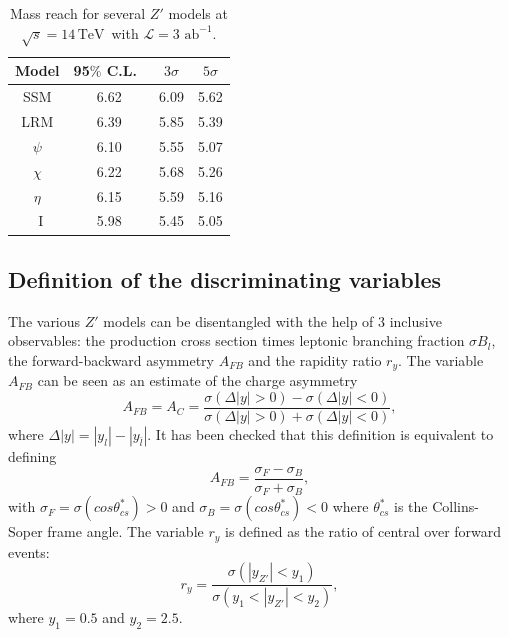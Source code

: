 \documentclass[a4paper,11pt]{article}
\newcommand*{\cl}{C.L.~}
\newcommand*{\sqrtslhc}{\ensuremath{\sqrt{s}=14\,\text{TeV}}}
\newcommand*{\intlumihllhc}{\ensuremath{\mathcal{L}=3\text{ ab}^{-1}}}
\begin{document}
%
\begin{table}
\centering
\begin{tabular}{c|c|c|c}

  Model &   95$\%$ \cl  &  $3\sigma$  & $5\sigma$   \\
\hline
\hline
SSM    &     6.62     &  6.09    &  5.62     \\
LRM    &   6.39     & 5.85     & 5.39  \\
$\psi$    &  6.10   & 5.55   & 5.07  \\
$\chi$   &  6.22    & 5.68    & 5.26   \\
$\eta$   &  6.15     &  5.59  &  5.16   \\
~I        & 5.98   &  5.45   &  5.05  \\
\end{tabular}
\caption{ Mass reach for several $Z'$ models at \sqrtslhc\ with \intlumihllhc. }
\label{tab:pheno:spec}
\end{table}
%

\subsection{Definition of the discriminating variables}
\label{par:vardef}

The various $Z'$ models can be disentangled with the help of 3 inclusive observables: the production cross section times leptonic branching fraction $\sigma B_l$, the forward-backward asymmetry $A_{FB}$ and the rapidity ratio $r_y$. The variable $A_{FB}$ can be seen as an estimate of the charge asymmetry
\begin{equation}
A_{FB} = A_C =  \frac{\sigma(\Delta|y| > 0) - \sigma(\Delta|y| < 0)}{\sigma(\Delta|y| > 0) + \sigma(\Delta|y| < 0)},
\end{equation}
where $\Delta|y| = |y_l| - |y_{\bar{l}}|$. It has been checked that this definition is equivalent to defining
\begin{equation}
A_{FB} = \frac{\sigma_F - \sigma_B}{\sigma_F + \sigma_B},
\end{equation}
with $\sigma_F = \sigma (cos\theta^{*}_{cs})>0$ and $\sigma_B = \sigma (cos\theta^{*}_{cs})<0$ where $\theta^*_{cs}$ is the Collins-Soper frame angle. The variable $r_y$ is defined as the ratio of central over forward events:
\begin{equation}
r_y = \frac{\sigma(|y_{Z'}| < y_1)}{\sigma(y_1 < |y_{Z'}| <y_2)},
\end{equation}
where $y_1=0.5$ and $y_2=2.5$.
\end{document}
